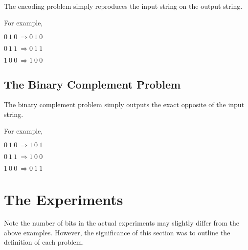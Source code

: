 	The encoding problem simply reproduces the input string on the
output string.

	For example,

	       $0\ 1\ 0\ \Longrightarrow 0\ 1\ 0$

	       $0\ 1\ 1\ \Longrightarrow 0\ 1\ 1$

	       $1\ 0\ 0\ \Longrightarrow 1\ 0\ 0$

\subsection{The Binary Complement Problem}

	The binary complement problem simply outputs the exact opposite
of the input string.

	For example,

	       $0\ 1\ 0\ \Longrightarrow 1\ 0\ 1$

	       $0\ 1\ 1\ \Longrightarrow 1\ 0\ 0$

	       $1\ 0\ 0\ \Longrightarrow 0\ 1\ 1$

\section{The Experiments}

	Note the number of bits in the actual experiments may slightly
differ from the above examples.  However, the significance of this
section was to outline the definition of each problem.  


